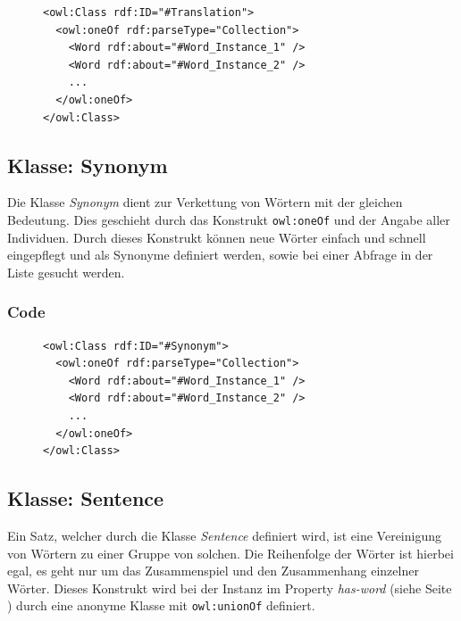 \documentclass[
    11pt,
    latin1,
    a4paper,
    oneside
]{scrreprt}
\begin{document}
\begin{figure}[H]
 \lstset{language=XML}
 \begin{lstlisting}[label=owl:translation,caption={Die Klasse \emph{Translation} beinhaltet alle \"Ubersetzungen eines Wortes}]
<owl:Class rdf:ID="#Translation">
  <owl:oneOf rdf:parseType="Collection">
    <Word rdf:about="#Word_Instance_1" />
    <Word rdf:about="#Word_Instance_2" />
    ...
  </owl:oneOf>
</owl:Class>
 \end{lstlisting}
\end{figure}

\subsection{Klasse: Synonym} \label{sec:class_synonym}

Die Klasse \emph{Synonym} dient zur Verkettung von W\"ortern mit der gleichen Bedeutung. Dies geschieht durch das Konstrukt \texttt{owl:oneOf} und der Angabe aller Individuen. Durch dieses Konstrukt k\"onnen neue W\"orter einfach und schnell eingepflegt und als Synonyme definiert werden, sowie bei einer Abfrage in der Liste gesucht werden.


\subsubsection{Code}  \label{sec:class_synonym_code}

\begin{figure}[H]
 \lstset{language=XML}
 \begin{lstlisting}[label=owl:synonym,caption={Die Klasse \emph{Synonym} beinhaltet alle W\"orter dir etwas \"ahnliches bedeuten}]
<owl:Class rdf:ID="#Synonym">
  <owl:oneOf rdf:parseType="Collection">
    <Word rdf:about="#Word_Instance_1" />
    <Word rdf:about="#Word_Instance_2" />
    ...
  </owl:oneOf>
</owl:Class>
 \end{lstlisting}
\end{figure}

\subsection{Klasse: Sentence} \label{sec:class_sentence}

Ein Satz, welcher durch die Klasse \emph{Sentence} definiert wird, ist eine Vereinigung von W\"ortern zu einer Gruppe von solchen. Die Reihenfolge der W\"orter ist hierbei egal, es geht nur um das Zusammenspiel und den Zusammenhang einzelner W\"orter. Dieses Konstrukt wird bei der Instanz im Property \emph{has-word} (siehe  Seite \pageref{sec:rel_hasword}) durch eine anonyme Klasse mit \texttt{owl:unionOf} definiert.
\end{document}
